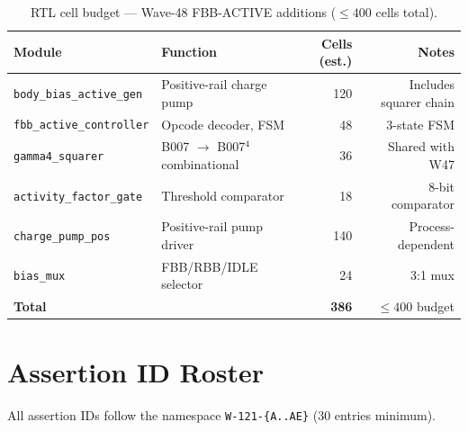 \documentclass[12pt,a4paper]{report}
\theoremstyle{plain}
\theoremstyle{definition}
\theoremstyle{remark}
\begin{document}
\begin{table}[h!]
\centering
\caption{RTL cell budget — Wave-48 FBB-ACTIVE additions ($\leq 400$ cells total).}
\label{tab:rtl_budget}
\begin{tabular}{llrr}
\toprule
Module & Function & Cells (est.) & Notes \\
\midrule
\texttt{body\_bias\_active\_gen} & Positive-rail charge pump & 120 & Includes squarer chain \\
\texttt{fbb\_active\_controller} & Opcode decoder, FSM & 48 & 3-state FSM \\
\texttt{gamma4\_squarer} & B007 $\to$ B007$^{4}$ combinational & 36 & Shared with W47 \\
\texttt{activity\_factor\_gate} & Threshold comparator & 18 & 8-bit comparator \\
\texttt{charge\_pump\_pos} & Positive-rail pump driver & 140 & Process-dependent \\
\texttt{bias\_mux} & FBB/RBB/IDLE selector & 24 & 3:1 mux \\
\midrule
\textbf{Total} & & \textbf{386} & $\leq 400$ budget \\
\bottomrule
\end{tabular}
\end{table}

\chapter{Assertion ID Roster}
\label{app:assertion_ids}

All assertion IDs follow the namespace \texttt{W-121-\{A..AE\}} (30 entries minimum).
\end{document}
